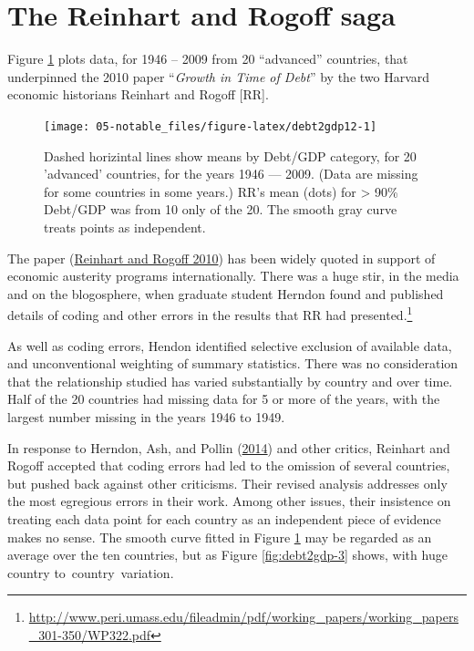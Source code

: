 \documentclass[
  10pt,
  b5paper]{book}
\begin{document}
\hypertarget{the-reinhart-and-rogoff-saga}{%
\section{The Reinhart and Rogoff saga}\label{the-reinhart-and-rogoff-saga}}

Figure \ref{fig:debt2gdp12} plots data, for 1946 -- 2009
from 20 ``advanced'' countries, that underpinned the 2010
paper ``\emph{Growth in Time of Debt}'' by the two Harvard economic
historians Reinhart and Rogoff {[}RR{]}.

\begin{figure}[H]

{\centering \texttt{[image: 05-notable\_files/figure-latex/debt2gdp12-1]} 

}

\caption{Dashed horizintal lines show means by Debt/GDP category, 
for 20 'advanced' countries, for the years 1946 --- 2009.
(Data are missing for some countries in some years.)
RR's mean (dots) for > 90\% Debt/GDP was from 10 only of the 20. 
The smooth gray curve treats points as independent.}\label{fig:debt2gdp12}
\end{figure}

The paper (\protect\hyperlink{ref-reinhart2010growth}{Reinhart and Rogoff 2010})
has been widely quoted in support of economic austerity programs
internationally. There was a huge stir, in the media and on the
blogosphere, when graduate student Herndon found and published
details of coding and other errors in the results that RR had
presented.\footnote{\url{http://www.peri.umass.edu/fileadmin/pdf/working_papers/working_papers_301-350/WP322.pdf}}

As well as coding errors, Hendon identified selective exclusion of
available data, and unconventional weighting of summary statistics.
There was no consideration that the relationship studied has varied
substantially by country and over time. Half of the 20 countries
had missing data for 5 or more of the years, with the largest
number missing in the years 1946 to 1949.

In response to Herndon, Ash, and Pollin (\protect\hyperlink{ref-herndon2014does}{2014}) and other critics, Reinhart and
Rogoff accepted that coding errors had led to the omission of
several countries, but pushed back against other criticisms.
Their revised analysis addresses only the most egregious errors
in their work. Among other issues, their insistence on treating
each data point for each country as an independent piece of
evidence makes no sense. The smooth curve fitted in Figure
\ref{fig:debt2gdp12} may be regarded as an average over the
ten countries, but as Figure \ref{fig:debt2gdp-3} shows, with
huge country to~country~variation.
\end{document}
